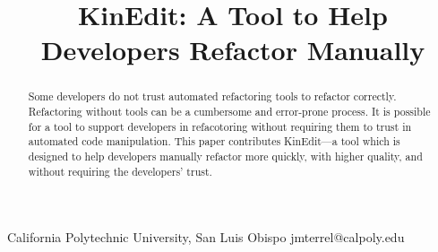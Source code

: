 \documentclass{sigplanconf}
\begin{document}
\setlength{\pdfpageheight}{\paperheight}
\setlength{\pdfpagewidth}{\paperwidth}




\permissiontopublish             %


\newcommand{\pname}{KinEdit}

\title{\pname{}: A Tool to Help Developers Refactor Manually}

           {California Polytechnic University, San Luis Obispo}
           {jmterrel@calpoly.edu}

\maketitle

\begin{abstract}
Some developers do not trust automated refactoring tools to refactor correctly.
Refactoring without tools can be a cumbersome and error-prone process.
It is possible for a tool to support developers in refacotoring without
requiring them to trust in automated code manipulation.
This paper contributes \pname{}---a tool which is designed to help developers
manually refactor more quickly, with higher quality,
and without requiring the developers' trust.
\end{abstract}

\end{document}
